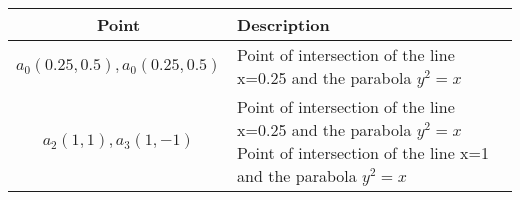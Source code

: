 \begin{tabular}{|c|p{5cm}|}
\hline
Point & Description \\  \hline
$a_0(0.25,0.5),a_0(0.25,0.5)$ &Point of intersection of the line x=0.25 and the parabola $y^2=x$ \\
	\hline
$a_2(1,1),a_3(1,-1)$ &Point of intersection of the line x=0.25 and the parabola $y^2=x$ Point of intersection of the line x=1 and the parabola $y^2=x$  \\  
	\hline
\end{tabular}


